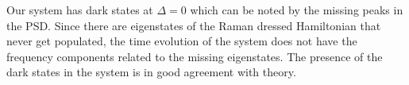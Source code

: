 Our system has dark states at $\Delta=0$ which can be noted by the missing peaks in the PSD. Since there are eigenstates of the Raman dressed Hamiltonian that never get populated, the time evolution of the system does not have the frequency components related to the missing eigenstates. The presence of the dark states in the system is in good agreement with theory. 
